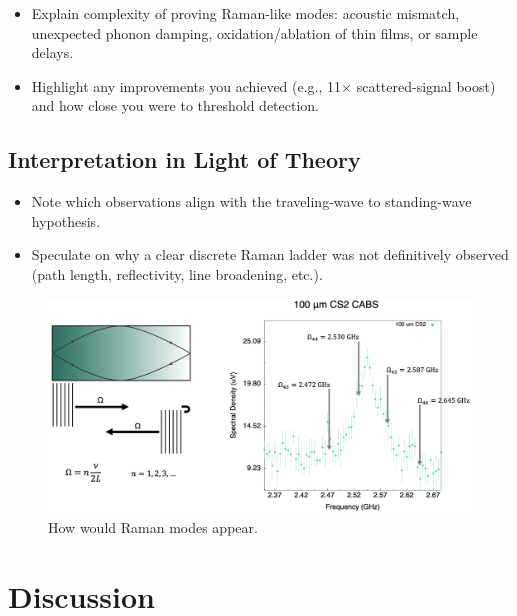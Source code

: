 \begin{itemize}
  \item Explain complexity of proving Raman-like modes: acoustic mismatch, unexpected phonon damping, oxidation/ablation of thin films, or sample delays.
  \item Highlight any improvements you achieved (e.g., 11\(\times\) scattered-signal boost) and how close you were to threshold detection.
\end{itemize}

\subsection{Interpretation in Light of Theory}
\label{subsec:Raman:InterpretationinLightofTheory}

\begin{itemize}
  \item Note which observations align with the traveling-wave to standing-wave hypothesis.
  \item Speculate on why a clear discrete Raman ladder was not definitively observed (path length, reflectivity, line broadening, etc.).
\end{itemize}

\begin{figure}[t]
  \centering
  \includegraphics[width=\textwidth]{figs/4-Raman/HowWouldRamanModesAppear.png}
  \caption{How would Raman modes appear.}
  \label{fig:HowWouldRamanModesAppear}
\end{figure}


\section{Discussion}
\label{sec:Raman:Discussion}


